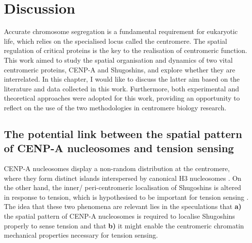 \chapter{Discussion}

Accurate chromosome segregation is a fundamental requirement for eukaryotic life, which relies on the specialised locus called the centromere. The spatial regulation of critical proteins is the key to the realisation of centromeric function. This work aimed to study the spatial organisation and dynamics of two vital centromeric proteins, CENP-A and Shugoshins, and explore whether they are interrelated. In this chapter, I would like to discuss the latter aim based on the literature and data collected in this work. Furthermore, both experimental and theoretical approaches were adopted for this work, providing an opportunity to reflect on the use of the two methodologies in centromere biology research. 

\section{The potential link between the spatial pattern of CENP-A nucleosomes and tension sensing}

CENP-A nucleosomes display a non-random distribution at the centromere, where they form distinct islands interspersed by canonical H3 nucleosomes \citep{Blower2002ConservedHumans, Dunleavy2011H3.3Phase., Kyriacou2018}. On the other hand, the inner/ peri-centromeric localisation of Shugoshins is altered in response to tension, which is hypothesised to be important for tension sensing \citep{Huang2007, Lee2008, Liu2013, Asai2020, Lee2008, Gomez2007, Eshleman2014, Nerusheva2014, Paldi2020ConvergentPericentromeres, Clarke2005, Kawashima2007}. The idea that these two phenomena are relevant lies in the speculations that \textbf{a)} the spatial pattern of CENP-A nucleosomes is required to localise Shugoshins properly to sense tension and that \textbf{b)} it might enable the centromeric chromatin mechanical properties necessary for tension sensing. 

